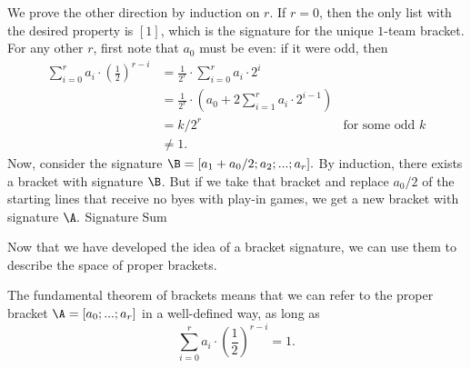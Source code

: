 {{        We prove the other direction by induction on $r$. If $r = 0$, then the only list with the desired property is $[1]$, which is the signature for the unique $1$-team bracket. For any other $r$, first note that $a_0$ must be even: if it were odd, then \begin{align*}
            \sum_{i=0}^r a_i \cdot \left(\frac{1}{2}\right)^{r - i}
            &= \frac{1}{2^r} \cdot \sum_{i=0}^r a_i \cdot 2^i\\
            &= \frac{1}{2^r} \cdot \left(a_0 + 2 \sum_{i=1}^r a_i \cdot 2^{i-1}\right)\\
            &= k/2^r &\textrm{for some odd $k$}\\
            &\neq 1.
        \end{align*}
        Now, consider the signature $\B = [a_1 + a_0/2; a_2; ...; a_r].$ By induction, there exists a bracket with signature $\B$. But if we take that bracket and replace $a_0/2$ of the starting lines that receive no byes with play-in games, we get a new bracket with signature $\A.$
}{Signature Sum}

Now that we have developed the idea of a bracket signature, we can use them to describe the space of proper brackets.


The fundamental theorem of brackets means that we can refer to the proper bracket $\A = [a_0; ...; a_r]$ in a well-defined way, as long as $$\sum_{i=0}^r a_i \cdot \left(\frac{1}{2}\right)^{r - i} = 1.$$

}
